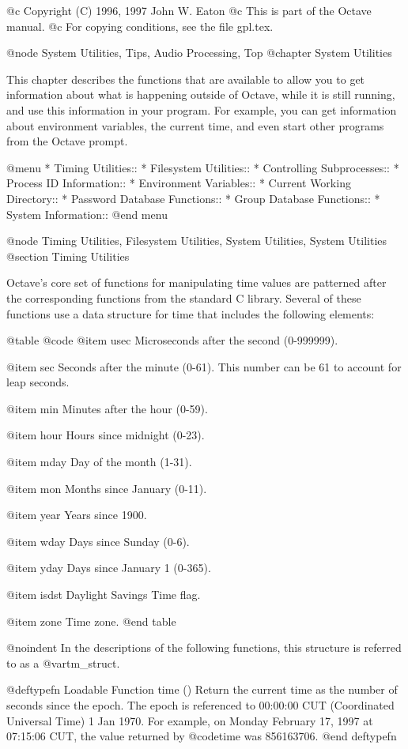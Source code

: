 @c Copyright (C) 1996, 1997 John W. Eaton
@c This is part of the Octave manual.
@c For copying conditions, see the file gpl.tex.

@node System Utilities, Tips, Audio Processing, Top
@chapter System Utilities

This chapter describes the functions that are available to allow you to
get information about what is happening outside of Octave, while it is
still running, and use this information in your program.  For example,
you can get information about environment variables, the current time,
and even start other programs from the Octave prompt.

@menu
* Timing Utilities::            
* Filesystem Utilities::        
* Controlling Subprocesses::    
* Process ID Information::      
* Environment Variables::       
* Current Working Directory::   
* Password Database Functions::  
* Group Database Functions::    
* System Information::          
@end menu

@node Timing Utilities, Filesystem Utilities, System Utilities, System Utilities
@section Timing Utilities

Octave's core set of functions for manipulating time values are
patterned after the corresponding functions from the standard C library.
Several of these functions use a data structure for time that includes
the following elements:

@table @code
@item usec
Microseconds after the second (0-999999).

@item sec
Seconds after the minute (0-61).  This number can be 61 to account
for leap seconds.

@item min
Minutes after the hour (0-59).

@item hour
Hours since midnight (0-23).

@item mday
Day of the month (1-31).

@item mon
Months since January (0-11).

@item year
Years since 1900.

@item wday
Days since Sunday (0-6).

@item yday
Days since January 1 (0-365).

@item isdst
Daylight Savings Time flag.

@item zone
Time zone.
@end table

@noindent
In the descriptions of the following functions, this structure is
referred to as a @var{tm_struct}.

@deftypefn {Loadable Function} {} time ()
Return the current time as the number of seconds since the epoch.  The
epoch is referenced to 00:00:00 CUT (Coordinated Universal Time) 1 Jan
1970.  For example, on Monday February 17, 1997 at 07:15:06 CUT, the
value returned by @code{time} was 856163706.
@end deftypefn

